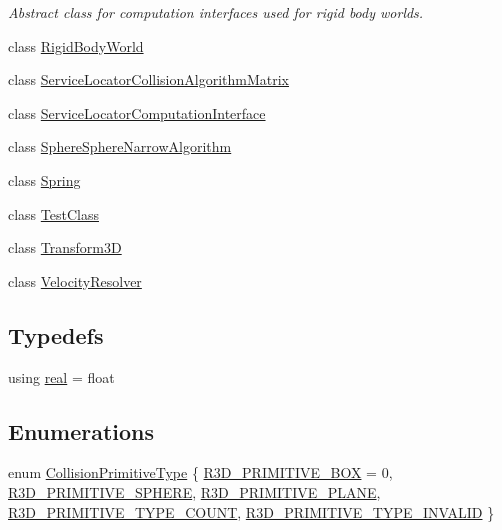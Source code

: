 \begin{DoxyCompactItemize}
\begin{DoxyCompactList}\small\item\em Abstract class for computation interfaces used for rigid body worlds. \end{DoxyCompactList}\item 
class \mbox{\hyperlink{classr3_1_1_rigid_body_world}{Rigid\+Body\+World}}
\item 
class \mbox{\hyperlink{classr3_1_1_service_locator_collision_algorithm_matrix}{Service\+Locator\+Collision\+Algorithm\+Matrix}}
\item 
class \mbox{\hyperlink{classr3_1_1_service_locator_computation_interface}{Service\+Locator\+Computation\+Interface}}
\item 
class \mbox{\hyperlink{classr3_1_1_sphere_sphere_narrow_algorithm}{Sphere\+Sphere\+Narrow\+Algorithm}}
\item 
class \mbox{\hyperlink{classr3_1_1_spring}{Spring}}
\item 
class \mbox{\hyperlink{classr3_1_1_test_class}{Test\+Class}}
\item 
class \mbox{\hyperlink{classr3_1_1_transform3_d}{Transform3D}}
\item 
class \mbox{\hyperlink{classr3_1_1_velocity_resolver}{Velocity\+Resolver}}
\end{DoxyCompactItemize}
\subsection*{Typedefs}
\begin{DoxyCompactItemize}
\item 
using \mbox{\hyperlink{namespacer3_ab2016b3e3f743fb735afce242f0dc1eb}{real}} = float
\end{DoxyCompactItemize}
\subsection*{Enumerations}
\begin{DoxyCompactItemize}
\item 
enum \mbox{\hyperlink{namespacer3_a7079ec5e42c1a55140d3bc093d49e319}{Collision\+Primitive\+Type}} \{ \newline
\mbox{\hyperlink{namespacer3_a7079ec5e42c1a55140d3bc093d49e319ab0db447fd7b2de84191d8b29231a2103}{R3\+D\+\_\+\+P\+R\+I\+M\+I\+T\+I\+V\+E\+\_\+\+B\+OX}} = 0, 
\mbox{\hyperlink{namespacer3_a7079ec5e42c1a55140d3bc093d49e319a287c9eb57336315360581fa6312676b5}{R3\+D\+\_\+\+P\+R\+I\+M\+I\+T\+I\+V\+E\+\_\+\+S\+P\+H\+E\+RE}}, 
\mbox{\hyperlink{namespacer3_a7079ec5e42c1a55140d3bc093d49e319a985a46f234b04b101f07474c97709be7}{R3\+D\+\_\+\+P\+R\+I\+M\+I\+T\+I\+V\+E\+\_\+\+P\+L\+A\+NE}}, 
\mbox{\hyperlink{namespacer3_a7079ec5e42c1a55140d3bc093d49e319aab4ac7e02ac0e76beed256986ef52cea}{R3\+D\+\_\+\+P\+R\+I\+M\+I\+T\+I\+V\+E\+\_\+\+T\+Y\+P\+E\+\_\+\+C\+O\+U\+NT}}, 
\newline
\mbox{\hyperlink{namespacer3_a7079ec5e42c1a55140d3bc093d49e319af4fa492ea93899254dd76639bbc4f30a}{R3\+D\+\_\+\+P\+R\+I\+M\+I\+T\+I\+V\+E\+\_\+\+T\+Y\+P\+E\+\_\+\+I\+N\+V\+A\+L\+ID}}
 \}
\end{DoxyCompactItemize}


